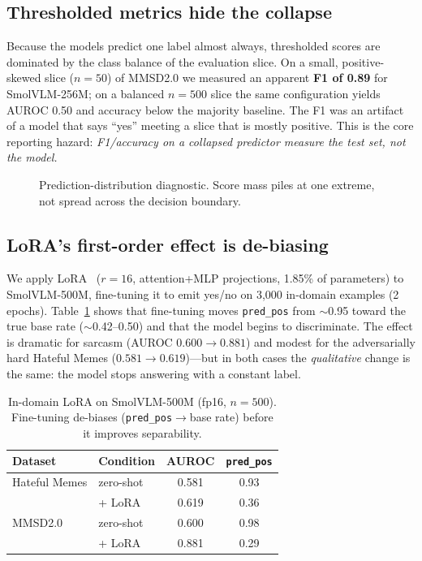 \documentclass[sigconf,nonacm]{acmart}
\begin{document}
\subsection{Thresholded metrics hide the collapse}
Because the models predict one label almost always, thresholded scores are dominated by
the class balance of the evaluation slice. On a small, positive-skewed slice
($n{=}50$) of MMSD2.0 we measured an apparent \textbf{F1 of 0.89} for SmolVLM-256M; on a
balanced $n{=}500$ slice the same configuration yields AUROC 0.50 and accuracy below the
majority baseline. The F1 was an artifact of a model that says ``yes'' meeting a slice
that is mostly positive. This is the core reporting hazard: \emph{F1/accuracy on a
collapsed predictor measure the test set, not the model.}
\begin{figure}[t]
\centering
\caption{Prediction-distribution diagnostic. Score mass piles at one extreme,
not spread across the decision boundary.}
\label{fig:hist}
\end{figure}

\subsection{LoRA's first-order effect is de-biasing}
We apply LoRA~\cite{hu2022lora} ($r{=}16$, attention+MLP projections, 1.85\% of
parameters) to SmolVLM-500M, fine-tuning it to emit yes/no on 3{,}000 in-domain examples
(2 epochs). Table~\ref{tab:lora} shows that fine-tuning moves \texttt{pred\_pos} from
$\sim$0.95 toward the true base rate ($\sim$0.42--0.50) and that the model begins to
discriminate. The effect is dramatic for sarcasm (AUROC $0.600\to0.881$) and modest for
the adversarially hard Hateful Memes ($0.581\to0.619$)---but in both cases the
\emph{qualitative} change is the same: the model stops answering with a constant label.

\begin{table}[t]
\centering
\caption{In-domain LoRA on SmolVLM-500M (fp16, $n{=}500$). Fine-tuning de-biases
(\texttt{pred\_pos}$\to$base rate) before it improves separability.}
\label{tab:lora}
\begin{tabular}{llcc}
\toprule
Dataset & Condition & AUROC & \texttt{pred\_pos} \\
\midrule
Hateful Memes & zero-shot & 0.581 & 0.93 \\
              & + LoRA    & 0.619 & 0.36 \\
\midrule
MMSD2.0       & zero-shot & 0.600 & 0.98 \\
              & + LoRA    & 0.881 & 0.29 \\
\bottomrule
\end{tabular}
\end{table}
\end{document}
